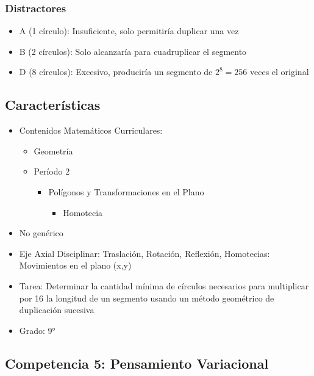 \documentclass[
]{article}
\providecommand{\tightlist}{%
  \setlength{\itemsep}{0pt}\setlength{\parskip}{0pt}}
\begin{document}
\subsubsection{Distractores}\label{distractores}

\begin{itemize}
\tightlist
\item
  A (1 círculo): Insuficiente, solo permitiría duplicar una vez
\item
  B (2 círculos): Solo alcanzaría para cuadruplicar el segmento
\item
  D (8 círculos): Excesivo, produciría un segmento de \(2^8 = 256\)
  veces el original
\end{itemize}

\subsection{Características}\label{caracteruxedsticas}

\begin{itemize}
\tightlist
\item
  Contenidos Matemáticos Curriculares:

  \begin{itemize}
  \tightlist
  \item
    Geometría
  \item
    Período 2

    \begin{itemize}
    \tightlist
    \item
      Polígonos y Transformaciones en el Plano

      \begin{itemize}
      \tightlist
      \item
        Homotecia
      \end{itemize}
    \end{itemize}
  \end{itemize}
\item
  No genérico
\item
  Eje Axial Disciplinar: Traslación, Rotación, Reflexión, Homotecias:
  Movimientos en el plano (x,y)
\item
  Tarea: Determinar la cantidad mínima de círculos necesarios para
  multiplicar por 16 la longitud de un segmento usando un método
  geométrico de duplicación sucesiva
\item
  Grado: 9°
\end{itemize}

\subsection{Competencia 5: Pensamiento
Variacional}\label{competencia-5-pensamiento-variacional}
\end{document}
